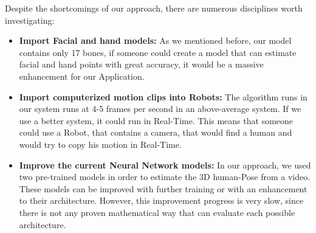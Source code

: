 Despite the shortcomings of our approach, there are numerous disciplines worth investigating:

\begin{itemize}
  \item \textbf{Import Facial and hand models: } As we mentioned before, our model contains only 17 bones, if someone could create a model that can estimate facial and hand points with great accuracy, it would be a massive enhancement for our Application.
  \item \textbf{Import computerized motion clips into Robots: } The algorithm runs in our system runs at 4-5 frames per second in an above-average system. If we use a better system, it could run in Real-Time. This means that someone could use a Robot, that contains a camera, that would find a human and would try to copy his motion in Real-Time.
  \item \textbf{Improve the current Neural Network models: } In our approach, we used two pre-trained models in order to estimate the 3D human-Pose from a video. These models can be improved with further training or with an enhancement to their architecture. However, this improvement progress is very slow, since there is not any proven mathematical way that can evaluate each possible architecture.   
\end{itemize} 